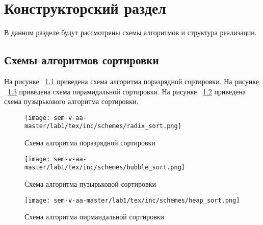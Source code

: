 \chapter{Конструкторский раздел}
\label{cha:design}

В данном разделе будут рассмотрены схемы алгоритмов и структура реализации.

\section{Схемы алгоритмов сортировки}
На рисунке ~\ref{fig:radix_sort} приведена схема алгоритма поразрядной сортировки.
На рисунке ~\ref{fig:heap_sort} приведена схема пирамидальной сортировки.
На рисунке ~\ref{fig:bubble_sort} приведена схема пузырькового алгоритма сортировки.

\begin{figure}
    \centering
    \texttt{[image: sem-v-aa-master/lab1/tex/inc/schemes/radix\_sort.png]}
    \caption{Схема алгоритма поразрядной сортировки}
    \label{fig:radix_sort}
\end{figure}

\begin{figure}
    \centering
    \texttt{[image: sem-v-aa-master/lab1/tex/inc/schemes/bubble\_sort.png]}
    \caption{Схема алгоритма пузырьковой сортировки}
    \label{fig:bubble_sort}
\end{figure}

\begin{figure}
    \centering
    \texttt{[image: sem-v-aa-master/lab1/tex/inc/schemes/heap\_sort.png]}
    \caption{Схема алгоритма пирмаидальной сортировки}
    \label{fig:heap_sort}
\end{figure}

